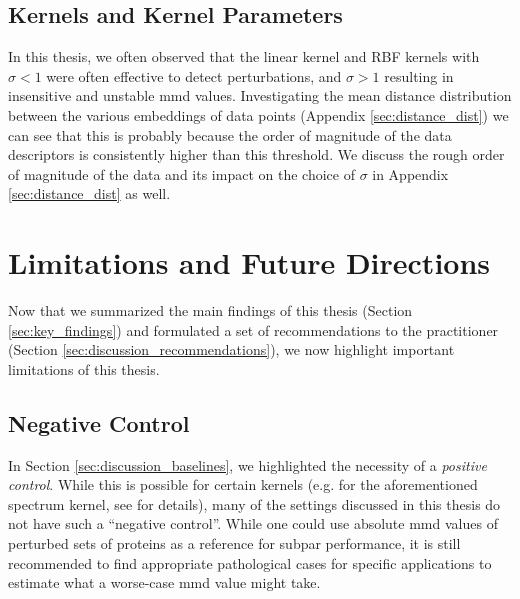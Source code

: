 \subsection{Kernels and Kernel Parameters}
In this thesis, we often observed that the linear kernel and RBF kernels with
$\sigma<1$ were often effective to detect perturbations, and $\sigma>1$
resulting in insensitive and unstable \acrshort{mmd} values. Investigating the mean
distance distribution between the various embeddings of data points (Appendix
\ref{sec:distance_dist}) we can see that this is probably because the order of
magnitude of the data descriptors is consistently higher than this threshold. We
discuss the rough order of magnitude of the data and its impact on the choice of
$\sigma$ in Appendix \ref{sec:distance_dist} as well.

\section{Limitations and Future Directions}\label{sec:discussion_limitations}

Now that we summarized the main findings of this thesis (Section
\ref{sec:key_findings}) and formulated a set of recommendations to the
practitioner (Section \ref{sec:discussion_recommendations}), we now highlight
important limitations of this thesis.


\subsection{Negative Control}

In Section \ref{sec:discussion_baselines}, we highlighted the necessity of a
\emph{positive control}. While this is possible for certain kernels (e.g. for
the aforementioned spectrum kernel, see \cite{kucera2021conditional} for
details), many of the settings discussed in this thesis do not have such a
``negative control''. While one could use absolute \acrshort{mmd} values of perturbed sets
of proteins as a reference for subpar performance, it is still recommended to find
appropriate pathological cases for specific applications to estimate what a worse-case
\acrshort{mmd} value might take.


